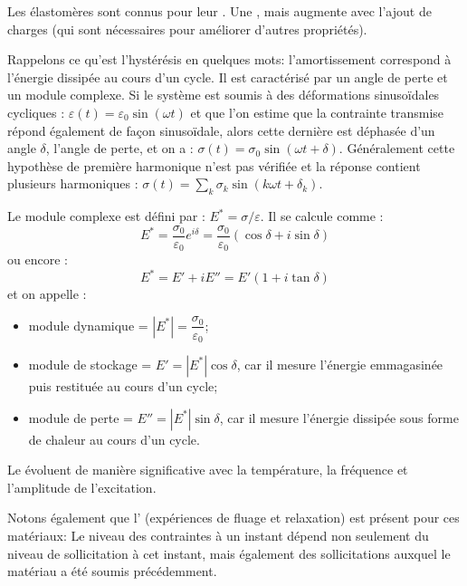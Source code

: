 \medskip
Les élastomères sont connus pour leur .
Une , mais augmente avec l'ajout de charges
(qui sont nécessaires pour améliorer d'autres propriétés).

Rappelons ce qu'est l'hystérésis en quelques mots: 
l'amortissement correspond à l'énergie dissipée au cours d'un cycle. Il est 
caractérisé par un angle de perte et un module complexe.
Si le système est soumis à des déformations sinusoïdales cycliques :
$\varepsilon(t)=\varepsilon_0\sin(\omega t)$ et que l'on estime que la
contrainte transmise répond également de façon sinusoïdale, alors cette
dernière est déphasée d'un angle $\delta$, l'angle de perte, et on a :
$\sigma(t)=\sigma_0\sin(\omega t+\delta)$.
Généralement cette hypothèse de première harmonique n'est pas
vérifiée et la réponse contient plusieurs harmoniques :
$\sigma(t) = \sum_k \sigma_k\sin(k\omega t+\delta_k)$.

Le module complexe est défini par : $E^* = \sigma / \varepsilon$. Il se calcule comme :
\begin{equation} E^*=\dfrac{\sigma_0}{\varepsilon_0}e^{i\delta}=\dfrac{\sigma_0}{\varepsilon_0}(\cos\delta+i\sin\delta)\end{equation}
ou encore :
\begin{equation}
E^* = E' + i E'' = E'(1+i\tan\delta)
\end{equation}
et on appelle :
\begin{itemize}
	\item module dynamique = $|E^*|=\dfrac{\sigma_0}{\varepsilon_0}$;
	\item module de stockage = $E'=|E^*|\cos\delta$, car il mesure l'énergie
		emmagasinée puis restituée au cours d'un cycle;
	\item module de perte = $E''=|E^*|\sin\delta$, car il mesure l'énergie
		dissipée sous forme de chaleur au cours d'un cycle.
\end{itemize}
Le 
évoluent de manière significative avec la température, la fréquence et l'amplitude
de l'excitation.

\medskip
Notons également que l' (expériences de fluage et relaxation) est présent
pour ces matériaux:
Le niveau des contraintes à un instant dépend non seulement du niveau de sollicitation
à cet instant, mais également des sollicitations auxquel le matériau a été soumis
précédemment.




